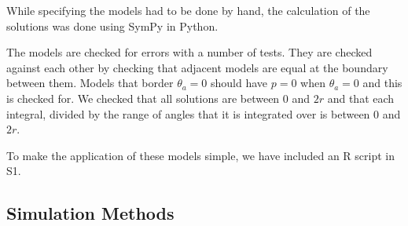 \documentclass[a4paper,10pt,reqno,oneside]{amsart}
\begin{document}
While specifying the models had to be done by hand, the calculation of the solutions was done using SymPy \citep{sympy} in Python. 

The models are checked for errors with a number of tests. They are checked against each other by checking that adjacent models are equal at the boundary between them. Models that border $ \theta_a = 0$ should have $p = 0$ when $ \theta_a = 0$ and this is checked for. We checked that all solutions are between 0 and $2r$ and that each integral, divided by the range of angles that it is integrated over is between 0 and $2r$.

To make the application of these models simple, we have included an R script in S1. 

\subsection{Simulation Methods}
\end{document}
